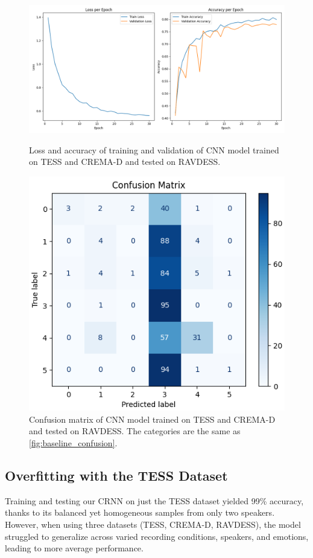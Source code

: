 \documentclass[../main.tex]{subfiles}
\begin{document}
\begin{figure}[ht]
    \centering
    \begin{minipage}{.5\textwidth}
      \centering
      \includegraphics[width=1.0\linewidth]{../resources/cnn_unmixed.png}
      \caption{Loss and accuracy of training and validation of CNN model trained on 
      TESS and CREMA-D and tested on RAVDESS.}
      \label{fig:cnn_unmixed}
    \end{minipage}%
    \hfill
    \begin{minipage}{.4\textwidth}
      \centering
      \includegraphics[width=.8\linewidth]{../resources/cnn_unmixed_confusion.png}
      \caption{Confusion matrix of CNN model trained on TESS and CREMA-D 
      and tested on RAVDESS. The categories are the same as 
      \autoref{fig:baseline_confusion}.} 
      \label{fig:cnn_unmixed_confusion}
    \end{minipage}
\end{figure}

\subsection{Overfitting with the TESS Dataset}

Training and testing our CRNN on just the TESS dataset yielded 99\% accuracy, 
thanks to its balanced yet homogeneous samples from only two speakers. However, 
when using three datasets (TESS, CREMA-D, RAVDESS), the model struggled to 
generalize across varied recording conditions, speakers, and emotions, leading 
to more average performance.
\end{document}
